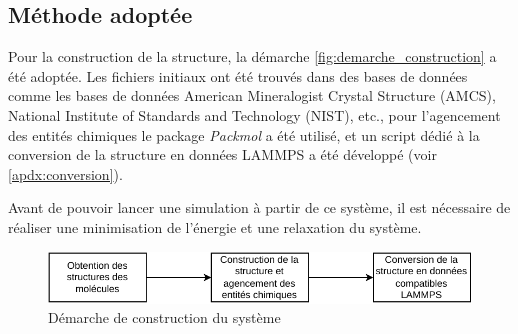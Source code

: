 \documentclass[a4paper, 11pt]{article}
\begin{document}
    \subsection{Méthode adoptée}

Pour la construction de la structure, la démarche \autoref{fig:demarche_construction} a été adoptée. Les fichiers initiaux ont été trouvés dans des bases de données comme les bases de données American Mineralogist Crystal Structure (AMCS), National Institute of Standards and Technology (NIST), etc., pour l'agencement des entités chimiques le package \emph{Packmol}\cite{martinez_packmol_2009} a été utilisé, et un script dédié à la conversion de la structure en données LAMMPS a été développé (voir \autoref{apdx:conversion}).

Avant de pouvoir lancer une simulation à partir de ce système, il est nécessaire de réaliser une minimisation de l'énergie et une relaxation du système.

\begin{figure}[hbp]
    \centering
    \includegraphics{ch-sc-construction.pdf}
    \caption{Démarche de construction du système}
    \label{fig:demarche_construction}
\end{figure}





\end{document}

